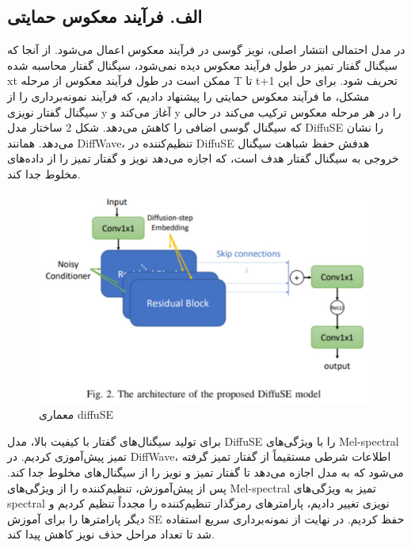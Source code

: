 \documentclass[fleqn]{report}
\begin{document}
\subsection{الف. فرآیند معکوس حمایتی}
در مدل احتمالی انتشار اصلی، نویز گوسی در فرآیند معکوس اعمال می‌شود. از آنجا که سیگنال گفتار تمیز در طول فرآیند معکوس دیده نمی‌شود، سیگنال گفتار محاسبه شده  xt​ ممکن است در طول فرآیند معکوس از مرحله T تا t+1 تحریف شود. برای حل این مشکل، ما فرآیند معکوس حمایتی را پیشنهاد دادیم، که فرآیند نمونه‌برداری را از سیگنال گفتار نویزی y آغاز می‌کند و y را در هر مرحله معکوس ترکیب می‌کند در حالی که سیگنال گوسی اضافی را کاهش می‌دهد.
شکل 2 ساختار مدل DiffuSE را نشان می‌دهد. همانند DiffWave، تنظیم‌کننده در DiffuSE هدفش حفظ شباهت سیگنال خروجی به سیگنال گفتار هدف است، که اجازه می‌دهد نویز و گفتار تمیز را از داده‌های مخلوط جدا کند. 

\begin{figure}[h]

    \centering
    \includegraphics[width=.6\textwidth, keepaspectratio]{images/diffuSE.jpg}
    
    \caption{معماری diffuSE}
    \label{fig:diffuSE}
\end{figure}

برای تولید سیگنال‌های گفتار با کیفیت بالا، مدل DiffuSE را با ویژگی‌های Mel-spectral تمیز پیش‌آموزی کردیم. در DiffWave، اطلاعات شرطی مستقیماً از گفتار تمیز گرفته می‌شود که به مدل اجازه می‌دهد تا گفتار تمیز و نویز را از سیگنال‌های مخلوط جدا کند. پس از پیش‌آموزش، تنظیم‌کننده را از ویژگی‌های Mel-spectral تمیز به ویژگی‌های spectral نویزی تغییر دادیم، پارامترهای رمزگذار تنظیم‌کننده را مجدداً تنظیم کردیم و دیگر پارامترها را برای آموزش SE حفظ کردیم. در نهایت از نمونه‌برداری سریع استفاده شد تا تعداد مراحل حذف نویز کاهش پیدا کند.
\end{document}
